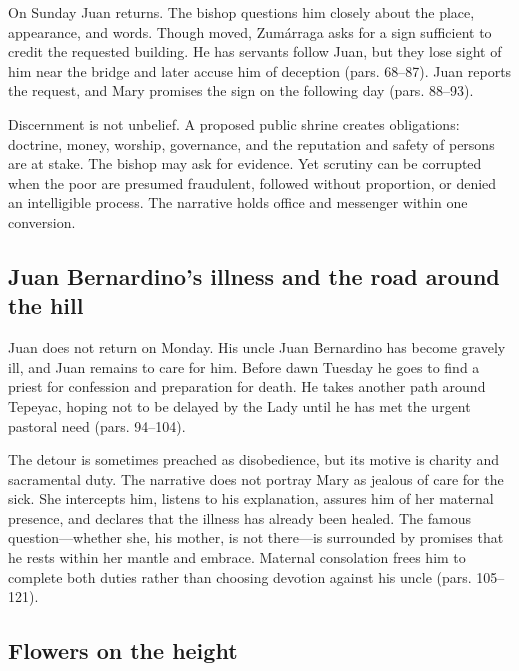 On Sunday Juan returns. The bishop questions him closely about the place, appearance, and words. Though moved, Zumárraga asks for a sign sufficient to credit the requested building. He has servants follow Juan, but they lose sight of him near the bridge and later accuse him of deception (pars. 68--87). Juan reports the request, and Mary promises the sign on the following day (pars. 88--93).

Discernment is not unbelief. A proposed public shrine creates obligations: doctrine, money, worship, governance, and the reputation and safety of persons are at stake. The bishop may ask for evidence. Yet scrutiny can be corrupted when the poor are presumed fraudulent, followed without proportion, or denied an intelligible process. The narrative holds office and messenger within one conversion.

\subsection{Juan Bernardino's illness and the road around the hill}

Juan does not return on Monday. His uncle Juan Bernardino has become gravely ill, and Juan remains to care for him. Before dawn Tuesday he goes to find a priest for confession and preparation for death. He takes another path around Tepeyac, hoping not to be delayed by the Lady until he has met the urgent pastoral need (pars. 94--104).

The detour is sometimes preached as disobedience, but its motive is charity and sacramental duty. The narrative does not portray Mary as jealous of care for the sick. She intercepts him, listens to his explanation, assures him of her maternal presence, and declares that the illness has already been healed. The famous question---whether she, his mother, is not there---is surrounded by promises that he rests within her mantle and embrace. Maternal consolation frees him to complete both duties rather than choosing devotion against his uncle (pars. 105--121).


\subsection{Flowers on the height}

